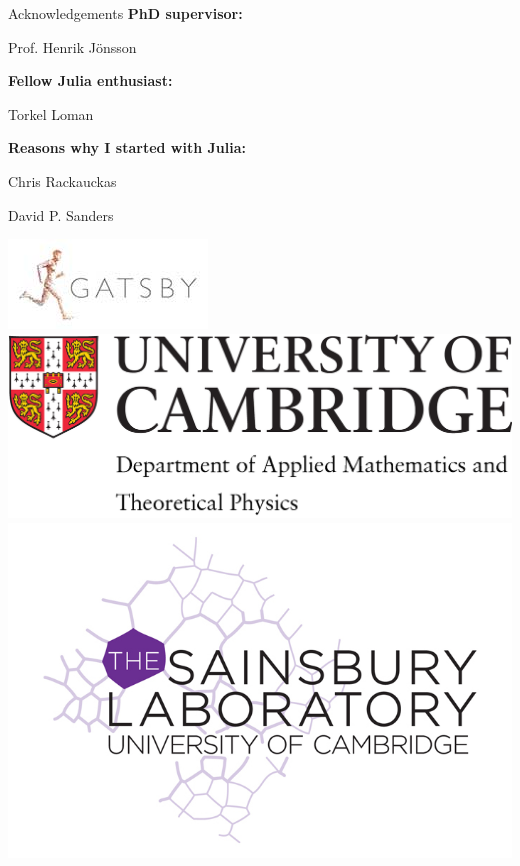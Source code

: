 \documentclass{beamer}
\begin{document}
\begin{frame}{Acknowledgements}
  \textbf{PhD supervisor:}

  Prof. Henrik Jönsson

  \textbf{Fellow Julia enthusiast:}

  Torkel Loman

  \textbf{Reasons why I started with Julia:}

  Chris Rackauckas

  David P. Sanders


\vspace{4mm}

  \includegraphics[height=0.15\textheight]{gatsby}\hspace{2mm}
  \includegraphics[height=0.15\textheight]{damtp}\hspace{2mm}
  \includegraphics[height=0.15\textheight]{slcu}\hspace{2mm}

\end{frame}
\end{document}
